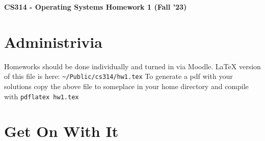 \documentclass[12pt]{article}
\begin{document}
\begin{center}
{\bf CS314 - Operating Systems Homework 1 (Fall '23)
}
\end{center}

\setlength{\unitlength}{1in}
\vspace{-.4in}
\section{Administrivia}
\vspace{-.3in}
Homeworks should be done individually and turned in via Moodle. LaTeX
version of this file is here: \verb#~/Public/cs314/hw1.tex# To generate a
pdf with your solutions copy the above file to someplace in your home
directory and compile with \verb#pdflatex hw1.tex#
\vspace{-.3in}
\section{Get On With It}
\end{document}
